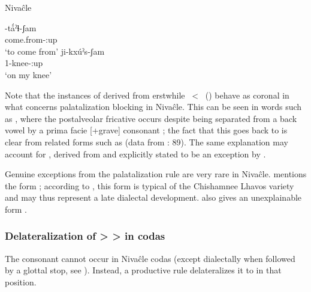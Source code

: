 \ea\label{ex:jamsham:3:niv}
Nivaĉle \citep[66]{AnG15}\\
    \begin{xlist}
        \ex\gll -tǻˀɬ-ʃam \\
                come.from-{\LOC}:up \\
                \glt `to come from'
        \ex\gll ji-kxúˀs-ʃam \\
                1{\SG}-knee-{\LOC}:up \\
                \glt `on my knee'
    \end{xlist}
\z

Note that the instances of  derived from erstwhile ~<~ () behave as coronal in what concerns palatalization blocking in Nivaĉle. This can be seen in words such as , where the postalveolar fricative  occurs despite being separated from a back vowel  by a prima facie [+grave] consonant ; the fact that this  goes back to  is clear from related forms such as  (data from : 89). The same explanation may account for , derived from  and explicitly stated to be an exception by \citet[211]{NS87}.

Genuine exceptions from the palatalization rule are very rare in Nivaĉle. \citet[66–67]{AnG15} mentions the form ; according to \citet[211]{NS87}, this form is typical of the Chishamnee Lhavos variety and may thus represent a late dialectal development. \citet[210]{NS87} also gives an unexplainable form .

\subsubsection{Delateralization of  >  >  in codas}\label{ni-kl-k}

The consonant  cannot occur in Nivaĉle codas (except dialectally when followed by a glottal stop, see ). Instead, a productive rule delateralizes it to  in that position.

